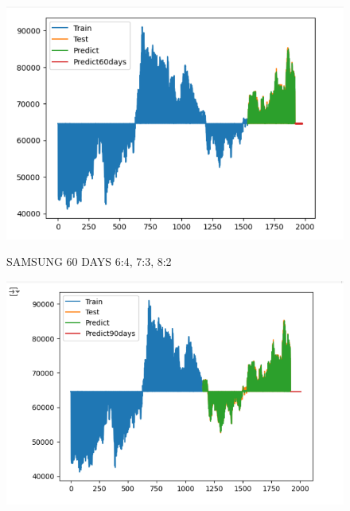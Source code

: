 \documentclass{article}
\begin{document}
\begin{multicols}{2}
\begin{figure}[H]
\begin{minipage}{0.15\textwidth}
    \label{fig:2}
    \end{minipage}%
    \begin{minipage}{0.15\textwidth}
    \centering
    \includegraphics[width=1\textwidth]{Image/GradientBoosting/SAMSUNG_60_8_2_GradientBoostingRegressor.png}

    \label{fig:3}
    \end{minipage}
    \caption{SAMSUNG 60 DAYS  6:4, 7:3, 8:2 }
\end{figure}

\begin{figure}[H]
    \centering
    \begin{minipage}{0.15\textwidth}
    \centering
    \includegraphics[width=1\textwidth]{Image/GradientBoosting/SAMSUNG_90_6_4_GradientBoostingRegressor.png}
   

\end{minipage}
\end{figure}
\end{multicols}
\end{document}
